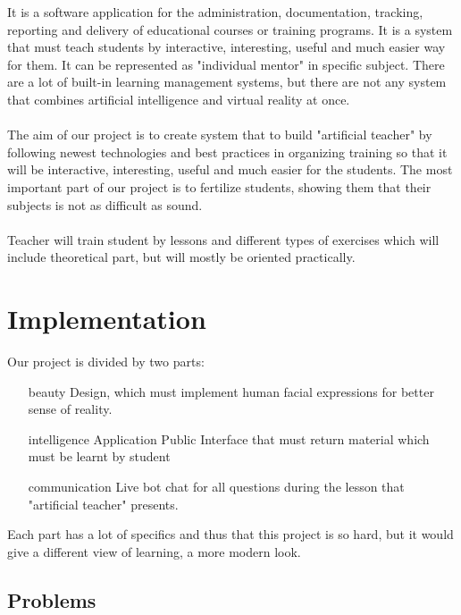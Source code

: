 \documentclass[a4paper, 12pt]{article}
\newenvironment{myblock}[1]{%
	\tcolorbox[beamer,%
	noparskip,breakable,
	colback=LightGreen,colframe=DarkGreen,%
	colbacklower=LimeGreen!75!LightGreen,%
	title=#1]}%
{\endtcolorbox}
\begin{document}
	\vspace{1cm}
	\large{
		\begin{myblock}{"Learning management system"}
			It is a software application for the administration, documentation, tracking, reporting and delivery of educational courses or training programs.
		\end{myblock}
		\vspace{1cm}
		\begin{myblock}{"Artificial teacher"}
			It is a system that must teach students by interactive, interesting, useful and much easier way for them. It can be represented as "individual mentor" in specific subject.
		\end{myblock}
		\vspace{1cm}
		There are a lot of built-in learning management systems, but there are not any system that combines artificial intelligence and virtual reality at once. \\
		\\
		The aim of our project is to create system that to build "artificial teacher" by following newest technologies and best practices in organizing training so that it will be interactive, interesting, useful and much easier for the students. The most important part of our project is to fertilize students, showing them that their subjects is not as difficult as sound.\\
		\\		
		Teacher will train student by lessons and different types of exercises which will include theoretical part, but will mostly be oriented practically. 
	}
	\section{Implementation}
		Our project is divided by two parts:
		\begin{itemize}
			\item[beauty] Design, which must implement human facial expressions for better sense of reality. 
			\item[intelligence] Application Public Interface that must return material which must be learnt by student
			\item[communication] Live bot chat for all questions during the lesson that "artificial teacher" presents. 
		\end{itemize}
		Each part has a lot of specifics and thus that this project is so hard, but it would give a different view of learning, a more modern look.
		\subsection{Problems}
\end{document}

